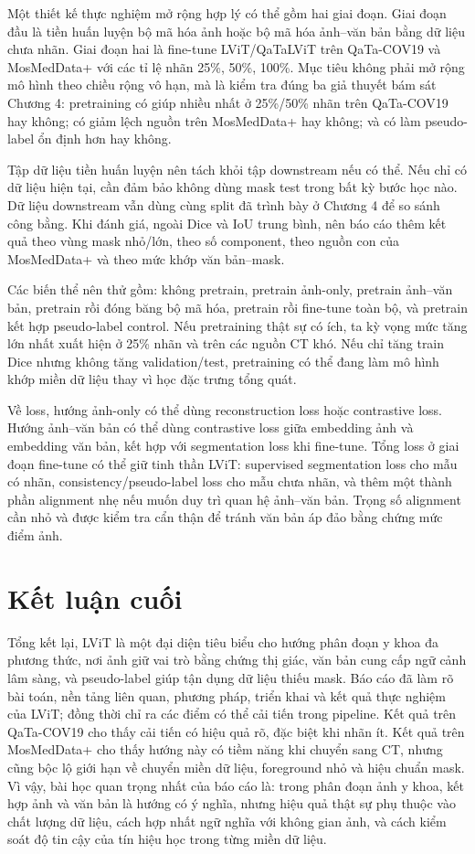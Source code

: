 Một thiết kế thực nghiệm mở rộng hợp lý có thể gồm hai giai đoạn. Giai đoạn đầu là tiền huấn luyện bộ mã hóa ảnh hoặc bộ mã hóa ảnh--văn bản bằng dữ liệu chưa nhãn. Giai đoạn hai là fine-tune LViT/QaTaLViT trên QaTa-COV19 và MosMedData+ với các tỉ lệ nhãn 25\%, 50\%, 100\%. Mục tiêu không phải mở rộng mô hình theo chiều rộng vô hạn, mà là kiểm tra đúng ba giả thuyết bám sát Chương 4: pretraining có giúp nhiều nhất ở 25\%/50\% nhãn trên QaTa-COV19 hay không; có giảm lệch nguồn trên MosMedData+ hay không; và có làm pseudo-label ổn định hơn hay không.

Tập dữ liệu tiền huấn luyện nên tách khỏi tập downstream nếu có thể. Nếu chỉ có dữ liệu hiện tại, cần đảm bảo không dùng mask test trong bất kỳ bước học nào. Dữ liệu downstream vẫn dùng cùng split đã trình bày ở Chương 4 để so sánh công bằng. Khi đánh giá, ngoài Dice và IoU trung bình, nên báo cáo thêm kết quả theo vùng mask nhỏ/lớn, theo số component, theo nguồn con của MosMedData+ và theo mức khớp văn bản--mask.

Các biến thể nên thử gồm: không pretrain, pretrain ảnh-only, pretrain ảnh--văn bản, pretrain rồi đóng băng bộ mã hóa, pretrain rồi fine-tune toàn bộ, và pretrain kết hợp pseudo-label control. Nếu pretraining thật sự có ích, ta kỳ vọng mức tăng lớn nhất xuất hiện ở 25\% nhãn và trên các nguồn CT khó. Nếu chỉ tăng train Dice nhưng không tăng validation/test, pretraining có thể đang làm mô hình khớp miền dữ liệu thay vì học đặc trưng tổng quát.

Về loss, hướng ảnh-only có thể dùng reconstruction loss hoặc contrastive loss. Hướng ảnh--văn bản có thể dùng contrastive loss giữa embedding ảnh và embedding văn bản, kết hợp với segmentation loss khi fine-tune. Tổng loss ở giai đoạn fine-tune có thể giữ tinh thần LViT: supervised segmentation loss cho mẫu có nhãn, consistency/pseudo-label loss cho mẫu chưa nhãn, và thêm một thành phần alignment nhẹ nếu muốn duy trì quan hệ ảnh--văn bản. Trọng số alignment cần nhỏ và được kiểm tra cẩn thận để tránh văn bản áp đảo bằng chứng mức điểm ảnh.

\section{Kết luận cuối}

Tổng kết lại, LViT là một đại diện tiêu biểu cho hướng phân đoạn y khoa đa phương thức, nơi ảnh giữ vai trò bằng chứng thị giác, văn bản cung cấp ngữ cảnh lâm sàng, và pseudo-label giúp tận dụng dữ liệu thiếu mask. Báo cáo đã làm rõ bài toán, nền tảng liên quan, phương pháp, triển khai và kết quả thực nghiệm của LViT; đồng thời chỉ ra các điểm có thể cải tiến trong pipeline. Kết quả trên QaTa-COV19 cho thấy cải tiến có hiệu quả rõ, đặc biệt khi nhãn ít. Kết quả trên MosMedData+ cho thấy hướng này có tiềm năng khi chuyển sang CT, nhưng cũng bộc lộ giới hạn về chuyển miền dữ liệu, foreground nhỏ và hiệu chuẩn mask. Vì vậy, bài học quan trọng nhất của báo cáo là: trong phân đoạn ảnh y khoa, kết hợp ảnh và văn bản là hướng có ý nghĩa, nhưng hiệu quả thật sự phụ thuộc vào chất lượng dữ liệu, cách hợp nhất ngữ nghĩa với không gian ảnh, và cách kiểm soát độ tin cậy của tín hiệu học trong từng miền dữ liệu.

